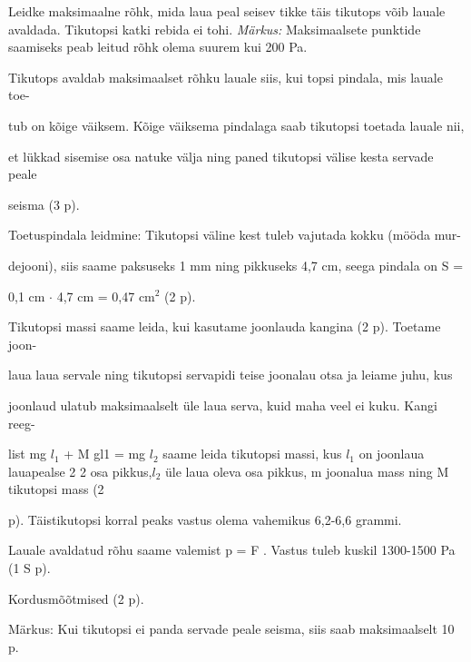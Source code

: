 
Leidke maksimaalne rõhk, mida laua peal seisev tikke täis tikutops võib lauale avaldada. Tikutopsi katki rebida ei tohi.
\textit{Märkus:} Maksimaalsete punktide saamiseks peab leitud rõhk olema suurem kui 200 Pa.

\hint

\solu
Tikutops avaldab maksimaalset rõhku lauale siis, kui topsi pindala, mis lauale toe-

tub on kõige väiksem. Kõige väiksema pindalaga saab tikutopsi toetada lauale nii,

et lükkad sisemise osa natuke välja ning paned tikutopsi välise kesta servade peale

seisma (3 p).

Toetuspindala leidmine: Tikutopsi väline kest tuleb vajutada kokku (mööda mur-

dejooni), siis saame paksuseks 1 mm ning pikkuseks 4,7 cm, seega pindala on S =

0,1 cm $\cdot$ 4,7 cm = 0,47 cm$^2$ (2 p).

Tikutopsi massi saame leida, kui kasutame joonlauda kangina (2 p). Toetame joon-

laua laua servale ning tikutopsi servapidi teise joonalau otsa ja leiame juhu, kus

joonlaud ulatub maksimaalselt üle laua serva, kuid maha veel ei kuku. Kangi reeg-

list mg $l_1$ + M gl1 = mg $l_2$ saame leida tikutopsi massi, kus $l_1$ on joonlaua lauapealse 2 2 osa pikkus,$l_2$ üle laua oleva osa pikkus, m joonalua mass ning M tikutopsi mass (2

p). Täistikutopsi korral peaks vastus olema vahemikus 6,2-6,6 grammi.

Lauale avaldatud rõhu saame valemist p = F . Vastus tuleb kuskil 1300-1500 Pa (1 S p).

Kordusmõõtmised (2 p).

Märkus: Kui tikutopsi ei panda servade peale seisma, siis saab maksimaalselt 10 p.
\probend
